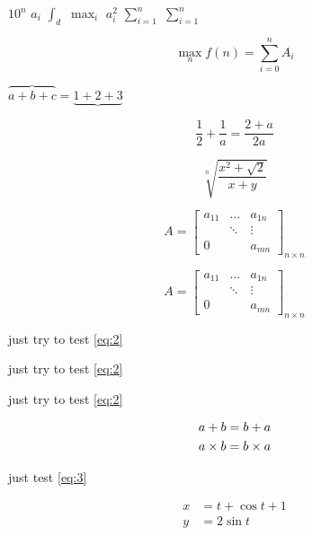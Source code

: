 \documentclass[UTF8]{ctexart}
\begin{document}
	

$10^n$   \quad $a_i$ \quad    $\int_d$   \quad   $\max_i$  \quad  $a_i^{2}$   \quad $\sum_{i=1}^{n}$ \quad 
$\sum\limits_{i=1}^n$
	
\[  \max_n f(n) = \sum_{i=0}^{n} A_i
\]

$\overbrace{a + b + c} = \underbrace{1+2+3}$ 


\[ \frac 12 + \frac 1a = \frac{2+a}{2a}
\]

\[	\sqrt[n]{\frac{x^2 + \sqrt{2}}{x+y}}
\]	



\[	
	A  = \begin{bmatrix}
	a_{11} &  \dots   & 	a_{1n}    \\
				&\ddots	  &	     \vdots     \\
	0		   &			&		a_{mn}	
\end{bmatrix}_{n \times n}	
\]

\begin{equation}
	A  = \begin{bmatrix}
	a_{11} &  \dots   & 	a_{1n}    \\
	&\ddots	  &	     \vdots     \\
	0		   &			&		a_{mn}	
	\end{bmatrix}_{n \times n}
	\label{eq:2}
\end{equation}

\par  just try to  test \ref{eq:2}

\par  just try to test  \autoref{eq:2}

\par  just try to  test \cref{eq:2}

\begin{gather}
	a + b  =   b  +  a    \label{eq:3}  \\
	a \times b   =  b  \times a      \notag
\end{gather}
\par just test \cref{eq:3}

\begin{align}
	x   &  =     t    +    \cos  t   +   1  \\
	y   &  =    2  \sin t    
\end{align}
\end{document}
